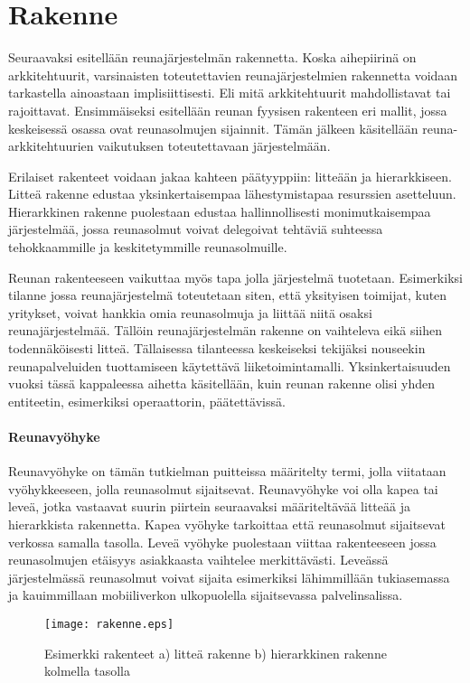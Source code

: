 \section{Rakenne} \label{rakenne}
Seuraavaksi esitellään reunajärjestelmän rakennetta.
Koska aihepiirinä on arkkitehtuurit, varsinaisten toteutettavien reunajärjestelmien rakennetta voidaan tarkastella ainoastaan implisiittisesti. 
Eli mitä arkkitehtuurit mahdollistavat tai rajoittavat.
Ensimmäiseksi esitellään reunan fyysisen rakenteen eri mallit, jossa keskeisessä osassa ovat reunasolmujen sijainnit.
Tämän jälkeen käsitellään reuna-arkkitehtuurien vaikutuksen toteutettavaan järjestelmään.

Erilaiset rakenteet voidaan jakaa kahteen päätyyppiin: litteään ja hierarkkiseen.
Litteä rakenne edustaa yksinkertaisempaa lähestymistapaa resurssien asetteluun. Hierarkkinen rakenne puolestaan edustaa hallinnollisesti monimutkaisempaa järjestelmää, jossa reunasolmut voivat delegoivat tehtäviä suhteessa tehokkaammille ja keskitetymmille reunasolmuille. 

Reunan rakenteeseen vaikuttaa myös tapa jolla järjestelmä tuotetaan.
Esimerkiksi tilanne jossa reunajärjestelmä toteutetaan siten, että yksityisen toimijat, kuten yritykset, voivat hankkia omia reunasolmuja ja liittää niitä osaksi reunajärjestelmää. Tällöin reunajärjestelmän rakenne on vaihteleva eikä siihen todennäköisesti litteä.
Tällaisessa tilanteessa keskeiseksi tekijäksi nouseekin reunapalveluiden tuottamiseen käytettävä liiketoimintamalli.
Yksinkertaisuuden vuoksi tässä kappaleessa aihetta käsitellään, kuin reunan rakenne olisi yhden entiteetin, esimerkiksi operaattorin, päätettävissä. 

\paragraph*{Reunavyöhyke}
Reunavyöhyke on tämän tutkielman puitteissa määritelty termi, jolla viitataan vyöhykkeeseen, jolla reunasolmut sijaitsevat. Reunavyöhyke voi olla kapea tai leveä, jotka vastaavat suurin piirtein seuraavaksi määriteltävää litteää ja hierarkkista rakennetta. Kapea vyöhyke tarkoittaa että reunasolmut sijaitsevat verkossa samalla tasolla. Leveä vyöhyke puolestaan viittaa rakenteeseen jossa reunasolmujen etäisyys asiakkaasta vaihtelee merkittävästi. Leveässä järjestelmässä reunasolmut voivat sijaita esimerkiksi lähimmillään tukiasemassa ja kauimmillaan mobiiliverkon ulkopuolella sijaitsevassa palvelinsalissa. 

\begin{figure}[tb]
\texttt{[image: rakenne.eps]}
\caption{Esimerkki rakenteet a) litteä rakenne b) hierarkkinen rakenne kolmella tasolla} \label{fig:rakenne}
\end{figure}

